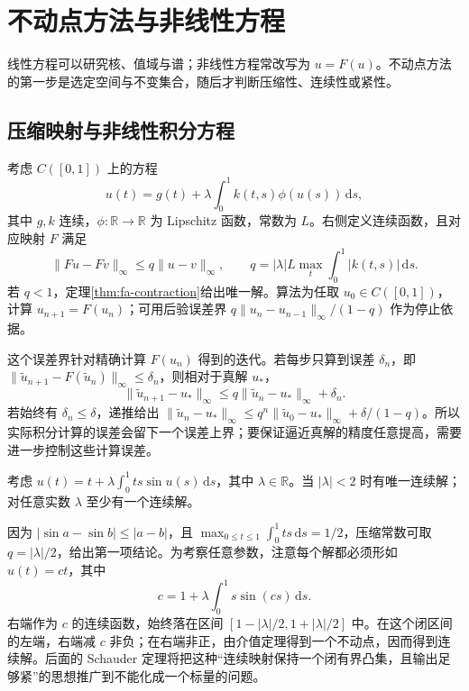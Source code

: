 \setcounter{chapter}{13} %
\chapter{不动点方法与非线性方程}
\label{chap:fa-fixed-point}

线性方程可以研究核、值域与谱；非线性方程常改写为 $u=F(u)$。不动点方法的第一步是选定空间与不变集合，随后才判断压缩性、连续性或紧性。

\section{压缩映射与非线性积分方程}
考虑 $C([0,1])$ 上的方程
\[
 u(t)=g(t)+\lambda\int_0^1k(t,s)\phi(u(s))\,\mathrm ds,
\]
其中 $g,k$ 连续，$\phi:\mathbb R\to\mathbb R$ 为 Lipschitz 函数，常数为 $L$。右侧定义连续函数，且对应映射 $F$ 满足
\[
 \|Fu-Fv\|_\infty\leq q\|u-v\|_\infty,
 \qquad q=|\lambda|L\max_t\int_0^1|k(t,s)|\,\mathrm ds.
\]
若 $q<1$，定理\ref{thm:fa-contraction}给出唯一解。算法为任取 $u_0\in C([0,1])$，计算 $u_{n+1}=F(u_n)$；可用后验误差界 $q\|u_n-u_{n-1}\|_\infty/(1-q)$ 作为停止依据。

这个误差界针对精确计算 $F(u_n)$ 得到的迭代。若每步只算到误差 $\delta_n$，即 $\|\widetilde u_{n+1}-F(\widetilde u_n)\|_\infty\leq\delta_n$，则相对于真解 $u_*$，
\[
 \|\widetilde u_{n+1}-u_*\|_\infty
 \leq q\|\widetilde u_n-u_*\|_\infty+\delta_n.
\]
若始终有 $\delta_n\leq\delta$，递推给出 $\|\widetilde u_n-u_*\|_\infty\leq q^n\|\widetilde u_0-u_*\|_\infty+\delta/(1-q)$。所以实际积分计算的误差会留下一个误差上界；要保证逼近真解的精度任意提高，需要进一步控制这些计算误差。

\begin{example}[一个既能用压缩性又能用紧性的方程]\label{ex:fa-nonlinear-integral}
考虑 $u(t)=t+\lambda\int_0^1ts\sin u(s)\,\mathrm ds$，其中 $\lambda\in\mathbb R$。当 $|\lambda|<2$ 时有唯一连续解；对任意实数 $\lambda$ 至少有一个连续解。
\end{example}
\begin{solve}
因为 $|\sin a-\sin b|\leq|a-b|$，且 $\max_{0\leq t\leq1}\int_0^1ts\,\mathrm ds=1/2$，压缩常数可取 $q=|\lambda|/2$，给出第一项结论。为考察任意参数，注意每个解都必须形如 $u(t)=ct$，其中
\[
 c=1+\lambda\int_0^1s\sin(cs)\,\mathrm ds.
\]
右端作为 $c$ 的连续函数，始终落在区间 $[1-|\lambda|/2,1+|\lambda|/2]$ 中。在这个闭区间的左端，右端减 $c$ 非负；在右端非正，由介值定理得到一个不动点，因而得到连续解。后面的 Schauder 定理将把这种“连续映射保持一个闭有界凸集，且输出足够紧”的思想推广到不能化成一个标量的问题。
\end{solve}

